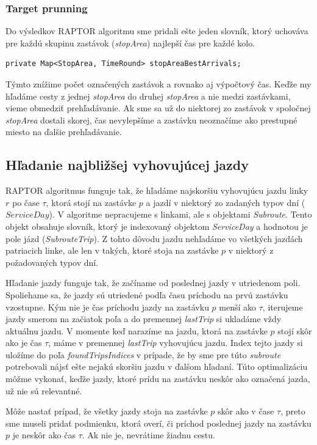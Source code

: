 \subsubsection{Target prunning}
Do výsledkov RAPTOR algoritmu sme pridali ešte jeden slovník, ktorý uchováva pre každú skupinu zastávok (\textit{stopArea}) najlepší čas pre každé kolo. 
\begin{lstlisting}
private Map<StopArea, TimeRound> stopAreaBestArrivals;
\end{lstlisting}
Týmto znížime počet označených zastávok a rovnako aj výpočtový čas. Keďže my hľadáme cesty z jednej \textit{stopArea} do druhej \textit{stopArea} a nie medzi zastávkami, vieme obmedziť prehľadávanie. Ak sme sa už do niektorej zo zastávok v spoločnej \textit{stopArea} dostali skorej, čas nevylepšíme a zastávku neoznačíme ako prestupné miesto na ďalšie prehľadávanie. 

\subsection{Hľadanie najbližšej vyhovujúcej jazdy}
\label{trip-finding}
RAPTOR algoritmus funguje tak, že hľadáme najskoršiu vyhovujúcu jazdu linky $r$ po čase $\tau$, ktorá stojí na zastávke $p$ a jazdí v niektorý zo zadaných typov dní ($ServiceDay$). V algoritme nepracujeme s linkami, ale s objektami \textit{Subroute}. Tento objekt obsahuje slovník, ktorý je indexovaný objektom \textit{ServiceDay} a hodnotou je pole jázd (\textit{SubrouteTrip}). Z tohto dôvodu jazdu nehľadáme vo všetkých jazdách patriacich linke, ale len v takých, ktoré stoja na zastávke $p$ v niektorý z požadovaných typov dní. 

Hľadanie jazdy funguje tak, že začíname od poslednej jazdy v utriedenom poli. Spoliehame sa, že jazdy sú utriedené podľa času príchodu na prvú zastávku vzostupne. Kým nie je čas príchodu jazdy na zastávku $p$ menší ako $\tau$, iterujeme jazdy smerom na začiatok poľa a do premennej \textit{lastTrip} si ukladáme vždy aktuálnu jazdu. V momente keď narazíme na jazdu, ktorá na zastávke $p$ stojí skôr ako je čas $\tau$, máme v premennej \textit{lastTrip} vyhovujúcu jazdu. Index tejto jazdy si uložíme do poľa \textit{foundTripsIndices} v prípade, že by sme pre túto \textit{subroute} potrebovali nájsť ešte nejakú skoršiu jazdu v ďalšom hľadaní. Túto optimalizáciu môžme vykonať, keďže jazdy, ktoré prídu na zastávku neskôr ako označená jazda, už nie sú relevantné.

Môže nastať prípad, že všetky jazdy stoja na zastávke $p$ skôr ako v čase $\tau$, preto sme museli pridať podmienku, ktorá overí, či príchod poslednej jazdy na zastávku $p$ je neskôr ako čas $\tau$. Ak nie je, nevrátime žiadnu cestu. 

